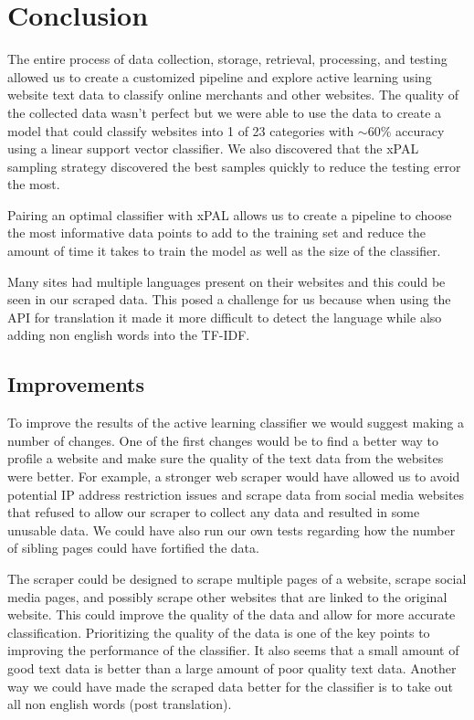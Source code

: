 \chapter*{Conclusion}

The entire process of data collection, storage, retrieval, processing, and testing allowed us to create a customized pipeline and explore active learning using website text data to classify online merchants and other websites. The quality of the collected data wasn't perfect but we were able to use the data to create a model that could classify websites into 1 of 23 categories with $\sim$60\% accuracy using a linear support vector classifier. We also discovered that the xPAL sampling strategy discovered the best samples quickly to reduce the testing error the most.

Pairing an optimal classifier with xPAL allows us to create a pipeline to choose the most informative data points to add to the training set and reduce the amount of time it takes to train the model as well as the size of the classifier.

Many sites had multiple languages present on their websites and this could be seen in our scraped data. This posed a challenge for us because when using the API for translation it made it more difficult to detect the language while also adding non english words into the TF-IDF.

\section*{Improvements}

To improve the results of the active learning classifier we would suggest making a number of changes. One of the first changes would be to find a better way to profile a website and make sure the quality of the text data from the websites were better. For example, a stronger web scraper would have allowed us to avoid potential IP address restriction issues and scrape data from social media websites that refused to allow our scraper to collect any data and resulted in some unusable data. We could have also run our own tests regarding how the number of sibling pages could have fortified the data.

The scraper could be designed to scrape multiple pages of a website, scrape social media pages, and possibly scrape other websites that are linked to the original website. This could improve the quality of the data and allow for more accurate classification. Prioritizing the quality of the data is one of the key points to improving the performance of the classifier. It also seems that a small amount of good text data is better than a large amount of poor quality text data. Another way we could have made the scraped data better for the classifier is to take out all non english words (post translation).

